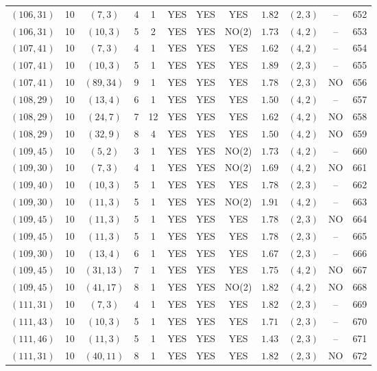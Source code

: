 \begin{longtable}{|c|c|c|c|c|c|c|c|c|c|c|c|}
$(106,31)$ & 10 & $(7,3)$ & 4 & 1 & YES & YES & YES & $1.82$ & $(2,3)$ & -- & 652\\
$(106,31)$ & 10 & $(10,3)$ & 5 & 2 & YES & YES & NO(2) & $1.73$ & $(4,2)$ & -- & 653\\
$(107,41)$ & 10 & $(7,3)$ & 4 & 1 & YES & YES & YES & $1.62$ & $(4,2)$ & -- & 654\\
$(107,41)$ & 10 & $(10,3)$ & 5 & 1 & YES & YES & YES & $1.89$ & $(2,3)$ & -- & 655\\
$(107,41)$ & 10 & $(89,34)$ & 9 & 1 & YES & YES & YES & $1.78$ & $(2,3)$ & NO & 656\\
$(108,29)$ & 10 & $(13,4)$ & 6 & 1 & YES & YES & YES & $1.50$ & $(4,2)$ & -- & 657\\
$(108,29)$ & 10 & $(24,7)$ & 7 & 12 & YES & YES & YES & $1.62$ & $(4,2)$ & NO & 658\\
$(108,29)$ & 10 & $(32,9)$ & 8 & 4 & YES & YES & YES & $1.50$ & $(4,2)$ & NO & 659\\
$(109,45)$ & 10 & $(5,2)$ & 3 & 1 & YES & YES & NO(2) & $1.73$ & $(4,2)$ & -- & 660\\
$(109,30)$ & 10 & $(7,3)$ & 4 & 1 & YES & YES & NO(2) & $1.69$ & $(4,2)$ & NO & 661\\
$(109,40)$ & 10 & $(10,3)$ & 5 & 1 & YES & YES & YES & $1.78$ & $(2,3)$ & -- & 662\\
$(109,30)$ & 10 & $(11,3)$ & 5 & 1 & YES & YES & NO(2) & $1.91$ & $(4,2)$ & -- & 663\\
$(109,45)$ & 10 & $(11,3)$ & 5 & 1 & YES & YES & YES & $1.78$ & $(2,3)$ & NO & 664\\
$(109,45)$ & 10 & $(11,3)$ & 5 & 1 & YES & YES & YES & $1.78$ & $(2,3)$ & -- & 665\\
$(109,30)$ & 10 & $(13,4)$ & 6 & 1 & YES & YES & YES & $1.67$ & $(2,3)$ & -- & 666\\
$(109,45)$ & 10 & $(31,13)$ & 7 & 1 & YES & YES & YES & $1.75$ & $(4,2)$ & NO & 667\\
$(109,45)$ & 10 & $(41,17)$ & 8 & 1 & YES & YES & NO(2) & $1.82$ & $(4,2)$ & NO & 668\\
$(111,31)$ & 10 & $(7,3)$ & 4 & 1 & YES & YES & YES & $1.82$ & $(2,3)$ & -- & 669\\
$(111,43)$ & 10 & $(10,3)$ & 5 & 1 & YES & YES & YES & $1.71$ & $(2,3)$ & -- & 670\\
$(111,46)$ & 10 & $(11,3)$ & 5 & 1 & YES & YES & YES & $1.43$ & $(2,3)$ & -- & 671\\
$(111,31)$ & 10 & $(40,11)$ & 8 & 1 & YES & YES & YES & $1.82$ & $(2,3)$ & NO & 672\\

\end{longtable}

